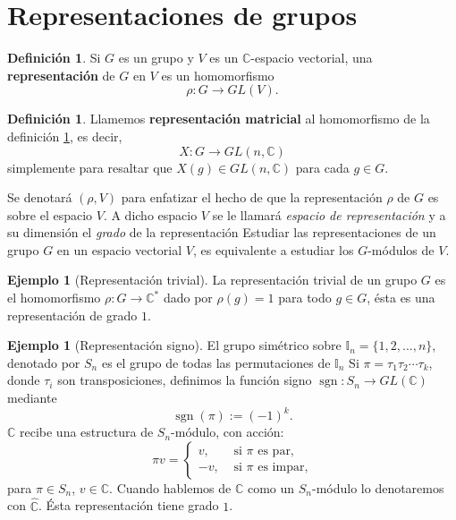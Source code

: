 \documentclass[12pt]{book}
\theoremstyle{definition}
\newtheorem{definition}[theorem]{Definición}
\newtheorem{example}[theorem]{Ejemplo}
\DeclareMathOperator{\sgn}{sgn}
\newcounter{in}
\newcounter{ini}
\begin{document}
\section{Representaciones de grupos}

\begin{definition}
  \label{representacion}
  Si $G$ es un grupo y $V$ es un $\mathbb{C}$-espacio vectorial, una
  \textbf{representación} de $G$ en $V$ es un homomorfismo 
     $$\rho:G\rightarrow GL(V).$$
\end{definition}
\begin{definition}
  Llamemos \textbf{representación matricial} al homomorfismo
   de la definición \ref{representacion}, es decir, 
   $$X:G\rightarrow GL(n,\mathbb{C})$$
   simplemente para resaltar que $X(g)\in GL(n,\mathbb{C})$ para cada $g\in G$.
\end{definition}
Se denotará $(\rho,V)$ para enfatizar el hecho de que la
representación $\rho$ de $G$  es sobre el espacio $V$. A
dicho espacio $V$ se le llamará \emph{espacio de representación} y a
su dimensión el \emph{grado} de la representación 
Estudiar las representaciones de un grupo $G$ en un espacio
vectorial $V$, es equivalente a estudiar los $G$-módulos de $V$. 

\begin{example}[Representación trivial]
  La representación trivial de un grupo $G$ es el homomorfismo
  $\rho:G\rightarrow \mathbb{C^{*}}$ dado por $\rho(g)=1$ para todo
  $g\in G$, ésta es una representación de grado $1$.
\end{example}

\begin{example}[Representación signo]
  El grupo simétrico sobre $\mathbb{I}_{n}=\{1,2,\ldots,n\}$, denotado
  por $S_{n}$ es el grupo de todas las permutaciones de $\mathbb{I}_{n}$ 
  Si $\pi=\tau_{1}\tau_{2}\cdots\tau_{k}$, donde $\tau_{i}$ son
  transposiciones, definimos la función signo
  $\sgn:S_{n} \rightarrow GL(\mathbb{C})$
  mediante $$\sgn(\pi):=(-1)^{k}.$$
  $\mathbb{C}$ recibe una estructura de $S_{n}$-módulo, con acción:
  \[
  \pi v=
  \begin{cases}
    v, & \text{ si } \pi \text{ es par,}\\
    -v, & \text{ si } \pi \text{ es impar,}
  \end{cases}
  \]
  para $\pi\in S_{n}$, $v\in \mathbb{C}$. Cuando hablemos de
  $\mathbb{C}$ como un $S_{n}$-módulo lo denotaremos con
  $\widehat{\mathbb{C}}$. Ésta representación tiene grado $1$.
\end{example}
\end{document}
